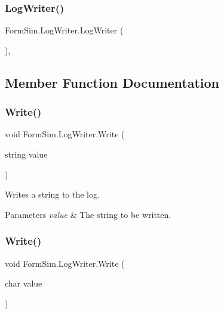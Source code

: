 \subsubsection{\texorpdfstring{Log\+Writer()}{LogWriter()}}
{\footnotesize\ttfamily Form\+Sim.\+Log\+Writer.\+Log\+Writer (\begin{DoxyParamCaption}{ }\end{DoxyParamCaption})\hspace{0.3cm}{\ttfamily [inline]}, {\ttfamily [private]}}



\subsection{Member Function Documentation}
\mbox{\label{class_form_sim_1_1_log_writer_a68f7b66a739339396ee0b575813fd986}} 
\subsubsection{\texorpdfstring{Write()}{Write()}\hspace{0.1cm}{\footnotesize\ttfamily [1/3]}}
{\footnotesize\ttfamily void Form\+Sim.\+Log\+Writer.\+Write (\begin{DoxyParamCaption}\item[{string}]{value }\end{DoxyParamCaption})\hspace{0.3cm}{\ttfamily [inline]}}



Writes a string to the log. 


\begin{DoxyParams}{Parameters}
{\em value} & The string to be written.\\
\hline
\end{DoxyParams}
\mbox{\label{class_form_sim_1_1_log_writer_ade1899b921aefffbe53695cfde35cd99}} 
\subsubsection{\texorpdfstring{Write()}{Write()}\hspace{0.1cm}{\footnotesize\ttfamily [2/3]}}
{\footnotesize\ttfamily void Form\+Sim.\+Log\+Writer.\+Write (\begin{DoxyParamCaption}\item[{char}]{value }\end{DoxyParamCaption})\hspace{0.3cm}{\ttfamily [inline]}}



